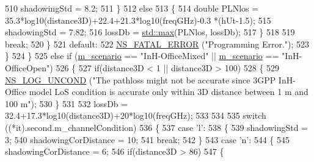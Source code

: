 \begin{DoxyCode}
510                                         shadowingStd = 8.2;
511                                 \}
512                                 \textcolor{keywordflow}{else}
513                                 \{
514                                         \textcolor{keywordtype}{double} PLNlos = 35.3*log10(distance3D)+22.4+21.3*log10(freqGHz)-0.3
      *(hUt-1.5);
515                                         shadowingStd = 7.82;
516                                         lossDb = \hyperlink{80211b_8c_affe776513b24d84b39af8ab0930fef7f}{std::max}(PLNlos, lossDb);
517                                 \}
518 
519                                 \textcolor{keywordflow}{break};
520                         \}
521                         \textcolor{keywordflow}{default}:
522                                 \hyperlink{group__fatal_ga5131d5e3f75d7d4cbfd706ac456fdc85}{NS\_FATAL\_ERROR} (\textcolor{stringliteral}{"Programming Error."});
523                 \}
524         \}
525         \textcolor{keywordflow}{else} \textcolor{keywordflow}{if} (\hyperlink{classMmWave3gppPropagationLossModel_a3ba2b9e45f4d02e49620faf03f97e898}{m\_scenario} == \textcolor{stringliteral}{"InH-OfficeMixed"} || \hyperlink{classMmWave3gppPropagationLossModel_a3ba2b9e45f4d02e49620faf03f97e898}{m\_scenario} == \textcolor{stringliteral}{"InH-OfficeOpen"})
526         \{
527                 \textcolor{keywordflow}{if}(distance3D < 1 || distance3D > 100)
528                 \{
529                         \hyperlink{log-macros-disabled_8h_a0b36e5e182b37194f85ef1c5e979fb2e}{NS\_LOG\_UNCOND} (\textcolor{stringliteral}{"The pathloss might not be accurate since 3GPP
       InH-Office model LoS condition is accurate only within 3D distance between 1 m and 100 m"});
530                 \}
531 
532                 lossDb = 32.4+17.3*log10(distance3D)+20*log10(freqGHz);
533 
534 
535                 \textcolor{keywordflow}{switch} ((*it).second.m\_channelCondition)
536                 \{
537                         \textcolor{keywordflow}{case} \textcolor{charliteral}{'l'}:
538                         \{
539                                 shadowingStd = 3;
540                                 shadowingCorDistance = 10;
541                                 \textcolor{keywordflow}{break};
542                         \}
543                         \textcolor{keywordflow}{case} \textcolor{charliteral}{'n'}:
544                         \{
545                                 shadowingCorDistance = 6;
546                                 \textcolor{keywordflow}{if}(distance3D > 86)
547                                 \{

\end{DoxyCode}
